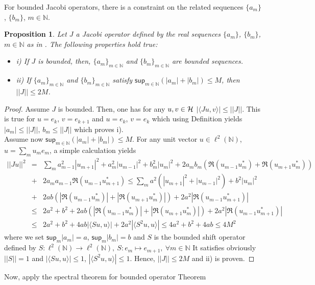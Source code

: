 \documentclass[10pt]{book}
\renewcommand{\sup}{\mathsf{sup}}
\theoremstyle{break}
\newtheorem{proposition}{Proposition}
\begin{document}
For bounded Jacobi operators, there is a constraint on the related sequences $\{a_m\}$, $\{b_m\}$, $m\in\mathbb{N}$.
\begin{proposition}
Let $J$ a Jacobi operator defined by the real sequences $\{a_m\}$, $\{b_m\}$, $m\in\mathbb{N}$ as in %
. The following properties hold true:
\begin{itemize}
\vspace*{-3pt}
\setlength{\itemsep}{-1pt}
\item i) If $J$ is bounded, then, $\{a_m\}_{m\in\mathbb{N}}$ and $\{b_m\}_{m\in\mathbb{N}}$ are bounded sequences.
\item ii) If $\{a_m\}_{m\in\mathbb{N}}$ and $\{b_m\}_{m\in\mathbb{N}}$ satisfy $\sup_{m\in\mathbb{N}}(|a_m|+|b_m|)\le M$, then $||J||\le2 M$.
\end{itemize}
\end{proposition}
\begin{proof}
Assume $J$ is bounded. Then, one has for any $u,v\in\cal{H}$ $|\langle Ju,v \rangle|\le ||J||$. This is true for $u=e_k$, $v=e_{k+1}$ and $u=e_k$, $v=e_k$ which using Definition %
yields $|a_m|\le||J||$, $b_m\le||J||$ which proves i). \\
Assume now $\sup_{m\in\mathbb{N}}(|a_m|+|b_m|)\le M$. For any unit vector $u\in\ell^2(\mathbb{N})$, $u=\sum_mu_me_m$, a simple calculation yields
\begin{eqnarray*}
||Ju||^2&=&\sum_ma^2_{m-1}|u_{m+1}|^2+a^2_m|u_{m-1}|^2+b^2_m|u_m|^2+2a_mb_m(\Re(u_{m-1}u^*_m)+\Re(u_{m+1}u^*_m))\nonumber\\
&+&2a_ma_{m-1}\Re(u_{m-1}u^*_{m+1})\le\sum_ma^2(|u_{m+1}|^2+|u_{m-1}|^2)+b^2|u_m|^2\nonumber\\
&+&2ab(|\Re(u_{m-1}u^*_m)|+|\Re(u_{m+1}u^*_m)|)+2a^2|\Re(u_{m-1}u^*_{m+1})|\nonumber\\
&\le&2a^2+b^2+2ab(|\Re(u_{m-1}u^*_m)|+|\Re(u_{m+1}u^*_m)|)+2a^2|\Re(u_{m-1}u^*_{m+1})|\nonumber\\
&\le&2a^2+b^2+4ab|\langle Su,u \rangle|+2a^2|\langle S^2u,u\rangle|\le4a^2+b^2+4ab\le4M^2
\end{eqnarray*}
where we set $\sup_m|a_m|=a$, $\sup_m|b_m|=b$ and $S$ is the bounded shift operator defined by $
S:\ell^2(\mathbb{N})\to\ell^2(\mathbb{N}),\ S:e_m\mapsto e_{m+1},\ \forall m\in\mathbb{N}$
It satisfies obviously $||S||=1$ and $|\langle Su,u\rangle|\le1$, $|\langle S^2u,u \rangle|\le1$. Hence, $||J||\le2M$ and ii) is proven.
\end{proof} 
Now, apply the spectral theorem for bounded operator Theorem %
\end{document}
